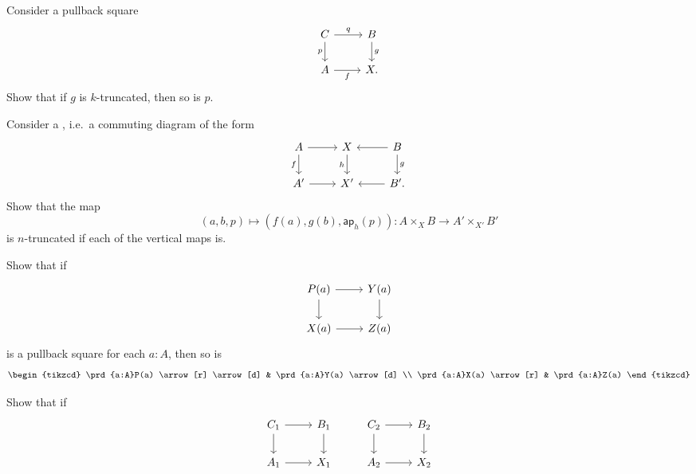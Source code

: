 \begin{exercises}
\item Consider a pullback square
\begin{equation*}
\begin{tikzcd}
C \arrow[r,"q"] \arrow[d,swap,"p"] & B \arrow[d,"g"] \\
A \arrow[r,swap,"f"] & X.
\end{tikzcd}
\end{equation*}
Show that if $g$ is $k$-truncated, then so is $p$.
\item Consider a , i.e.~a commuting diagram of the form
\begin{equation*}
\begin{tikzcd}
A \arrow[r] \arrow[d,swap,"f"] & X \arrow[d,swap,"h"] & B \arrow[l] \arrow[d,"g"] \\
A' \arrow[r] & X' & B'. \arrow[l]
\end{tikzcd}
\end{equation*}
Show that the map
\begin{equation*}
(a,b,p)\mapsto (f(a),g(b),\mathsf{ap}_h(p)): A \times_X B \to A'\times_{X'} B'
\end{equation*}
is $n$-truncated if each of the vertical maps is.
\item 
\begin{subexenum}
\item Show that if 
\begin{equation*}
\begin{tikzcd}
P(a) \arrow[r] \arrow[d] & Y(a) \arrow[d] \\
X(a) \arrow[r] & Z(a)
\end{tikzcd}
\end{equation*}
is a pullback square for each $a:A$, then so is
\begin{equation*}
\begin{tikzcd}
\prd{a:A}P(a) \arrow[r] \arrow[d] & \prd{a:A}Y(a) \arrow[d] \\
\prd{a:A}X(a) \arrow[r] & \prd{a:A}Z(a)
\end{tikzcd}
\end{equation*}
\item Show that if
\begin{equation*}
\begin{tikzcd}
C_1 \arrow[r] \arrow[d] & B_1 \arrow[d] & C_2 \arrow[r] \arrow[d] & B_2 \arrow[d] \\
A_1 \arrow[r] & X_1 & A_2 \arrow[r] & X_2
\end{tikzcd}
\end{equation*}

\end{subexenum}
\end{exercises}
